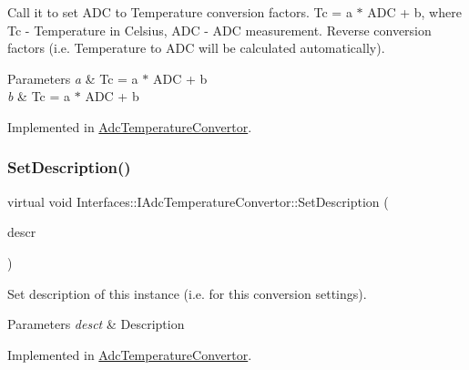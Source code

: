 Call it to set A\+DC to Temperature conversion factors. Tc = a $\ast$ A\+DC + b, where Tc -\/ Temperature in Celsius, A\+DC -\/ A\+DC measurement. Reverse conversion factors (i.\+e. Temperature to A\+DC will be calculated automatically). 


\begin{DoxyParams}{Parameters}
{\em a} & Tc = a $\ast$ A\+DC + b \\
\hline
{\em b} & Tc = a $\ast$ A\+DC + b \\
\hline
\end{DoxyParams}


Implemented in \hyperlink{class_adc_temperature_convertor_a5a19355f805554763e914e5b2216d5f6}{Adc\+Temperature\+Convertor}.

\mbox{\label{class_interfaces_1_1_i_adc_temperature_convertor_a65bbef2300e21c495d95305921ddb74b}} 
\subsubsection{\texorpdfstring{Set\+Description()}{SetDescription()}}
{\footnotesize\ttfamily virtual void Interfaces\+::\+I\+Adc\+Temperature\+Convertor\+::\+Set\+Description (\begin{DoxyParamCaption}\item[{Q\+String}]{descr }\end{DoxyParamCaption})\hspace{0.3cm}{\ttfamily [pure virtual]}}



Set description of this instance (i.\+e. for this conversion settings). 


\begin{DoxyParams}{Parameters}
{\em desct} & Description \\
\hline
\end{DoxyParams}


Implemented in \hyperlink{class_adc_temperature_convertor_a56103443d7da4769339ddb685a0a8df0}{Adc\+Temperature\+Convertor}.

\mbox{\label{class_interfaces_1_1_i_adc_temperature_convertor_ab5d3453ecc41848b723a790fe7e01f79}} 
